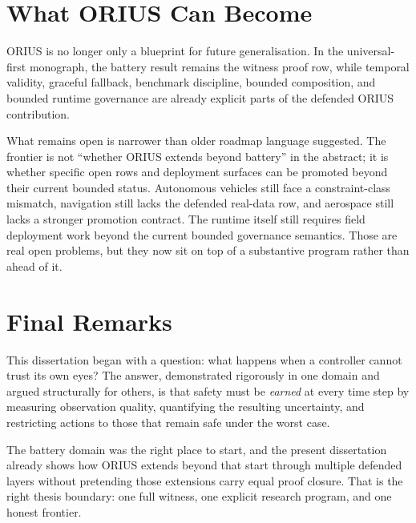 \section{What ORIUS Can Become}

ORIUS is no longer only a blueprint for future generalisation.  In the
universal-first monograph, the battery result remains the witness proof
row, while temporal validity, graceful fallback, benchmark discipline,
bounded composition, and bounded runtime governance are already explicit parts
of the defended ORIUS contribution.

What remains open is narrower than older roadmap language suggested.  The
frontier is not ``whether ORIUS extends beyond battery'' in the abstract; it
is whether specific open rows and deployment surfaces can be promoted beyond
their current bounded status.  Autonomous vehicles still face a
constraint-class mismatch, navigation still lacks the defended real-data row,
and aerospace still lacks a stronger promotion contract.  The runtime itself
still requires field deployment work beyond the current bounded governance
semantics.  Those are real open problems, but they now sit on top of a
substantive program rather than ahead of it.

\section{Final Remarks}

This dissertation began with a question: what happens when a controller
cannot trust its own eyes?  The answer, demonstrated rigorously in one
domain and argued structurally for others, is that safety must be
\emph{earned} at every time step by measuring observation quality,
quantifying the resulting uncertainty, and restricting actions to those
that remain safe under the worst case.

The battery domain was the right place to start, and the present dissertation
already shows how ORIUS extends beyond that start through multiple defended
layers without pretending those extensions carry equal proof closure.  That is
the right thesis boundary: one full witness, one explicit research program,
and one honest frontier.
